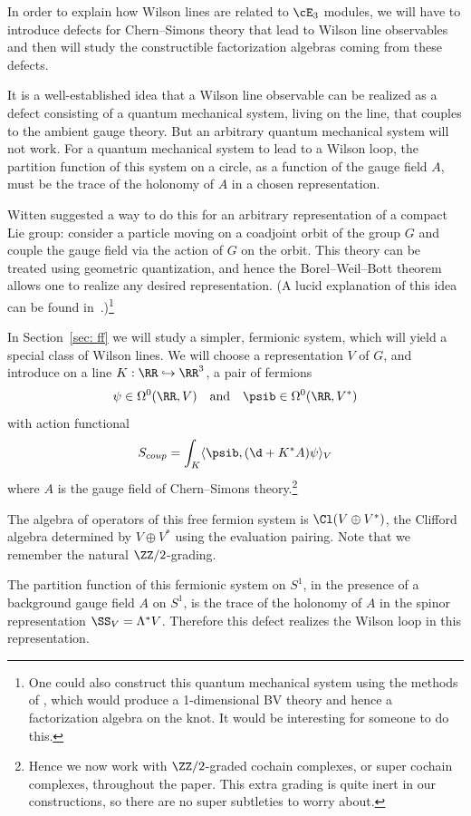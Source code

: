 \documentclass[10pt]{amsart}
\begin{document}
In order to explain how Wilson lines are related to $\cE_3$ modules, 
we will have to introduce defects for Chern--Simons theory that lead to Wilson line observables 
and then will study the constructible factorization algebras coming from these defects.

It is a well-established idea that a Wilson line observable can be realized as a defect consisting of a quantum mechanical system, living on the line, that couples to the ambient gauge theory. 
But an arbitrary quantum mechanical system will not work.
For a quantum mechanical system to lead to a Wilson loop, 
the partition function of this system on a circle, as a function of the gauge field $A$, 
must be the trace of the holonomy of $A$ in a chosen representation.  

Witten \cite{WitCS} suggested a way to do this for an arbitrary representation of a compact Lie group: 
consider a particle moving on a coadjoint orbit of the group $G$ and couple the gauge field via the action of $G$ on the orbit. 
This theory can be treated using geometric quantization, 
and hence the Borel--Weil--Bott theorem allows one to realize any desired representation.
(A lucid explanation of this idea can be found in~\cite{BeaCS}.)\footnote{One could also construct this quantum mechanical system using the methods of \cite{GG,GLL},
which would produce a 1-dimensional BV theory and hence a factorization algebra on the knot.
It would be interesting for someone to do this.}

In Section~\ref{sec: ff} we will study a simpler, fermionic system, which will yield a special class of Wilson lines.  
We will choose a representation $V$ of $G$, and introduce on a line $K: \RR \hookrightarrow \RR^3$, a pair of fermions
\[
	\psi \in \Omega^0(\RR, V) \quad\text{and}\quad
	\psib \in \Omega^0(\RR,V^\ast)
\]
with action functional
\[
S_{coup} = \int_K \langle \psib, (\d+K^*A) \psi \rangle_V
\]
where $A$ is the gauge field of Chern--Simons theory.\footnote{Hence we now work with $\ZZ/2$-graded cochain complexes, or super cochain complexes, throughout the paper. This extra grading is quite inert in our constructions, so there are no super subtleties to worry about.}

The algebra of operators of this free fermion system is $\Cl(V \oplus V^*)$, 
the Clifford algebra determined by $V \oplus V^*$ using the evaluation pairing.
Note that we remember the natural $\ZZ/2$-grading.

The partition function of this fermionic system on $S^1$, in the presence of a background gauge field $A$ on $S^1$, is the trace of the holonomy of $A$ in the spinor representation $\SS_V = \Lambda^\ast V$.  
Therefore this defect realizes the Wilson loop in this representation.
\end{document}
